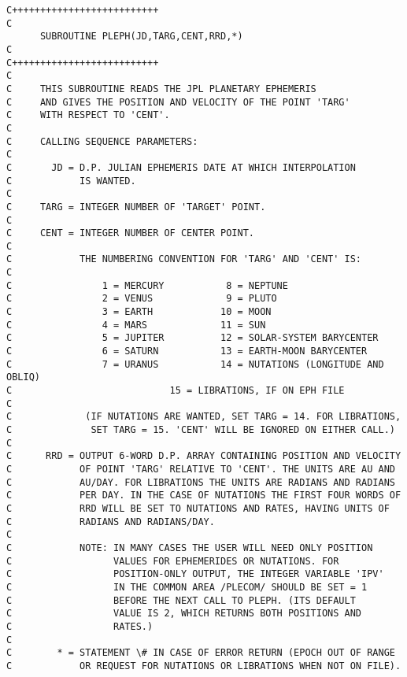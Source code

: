 \begin{verbatim}
C++++++++++++++++++++++++++
C
      SUBROUTINE PLEPH(JD,TARG,CENT,RRD,*)
C
C++++++++++++++++++++++++++
C
C     THIS SUBROUTINE READS THE JPL PLANETARY EPHEMERIS
C     AND GIVES THE POSITION AND VELOCITY OF THE POINT 'TARG'
C     WITH RESPECT TO 'CENT'.
C
C     CALLING SEQUENCE PARAMETERS:
C
C       JD = D.P. JULIAN EPHEMERIS DATE AT WHICH INTERPOLATION
C            IS WANTED.
C
C     TARG = INTEGER NUMBER OF 'TARGET' POINT.
C
C     CENT = INTEGER NUMBER OF CENTER POINT.
C
C            THE NUMBERING CONVENTION FOR 'TARG' AND 'CENT' IS:
C
C                1 = MERCURY           8 = NEPTUNE
C                2 = VENUS             9 = PLUTO
C                3 = EARTH            10 = MOON
C                4 = MARS             11 = SUN
C                5 = JUPITER          12 = SOLAR-SYSTEM BARYCENTER
C                6 = SATURN           13 = EARTH-MOON BARYCENTER
C                7 = URANUS           14 = NUTATIONS (LONGITUDE AND OBLIQ)
C                            15 = LIBRATIONS, IF ON EPH FILE
C
C             (IF NUTATIONS ARE WANTED, SET TARG = 14. FOR LIBRATIONS,
C              SET TARG = 15. 'CENT' WILL BE IGNORED ON EITHER CALL.)
C
C      RRD = OUTPUT 6-WORD D.P. ARRAY CONTAINING POSITION AND VELOCITY
C            OF POINT 'TARG' RELATIVE TO 'CENT'. THE UNITS ARE AU AND
C            AU/DAY. FOR LIBRATIONS THE UNITS ARE RADIANS AND RADIANS
C            PER DAY. IN THE CASE OF NUTATIONS THE FIRST FOUR WORDS OF
C            RRD WILL BE SET TO NUTATIONS AND RATES, HAVING UNITS OF
C            RADIANS AND RADIANS/DAY.
C
C            NOTE: IN MANY CASES THE USER WILL NEED ONLY POSITION
C                  VALUES FOR EPHEMERIDES OR NUTATIONS. FOR
C                  POSITION-ONLY OUTPUT, THE INTEGER VARIABLE 'IPV'
C                  IN THE COMMON AREA /PLECOM/ SHOULD BE SET = 1
C                  BEFORE THE NEXT CALL TO PLEPH. (ITS DEFAULT
C                  VALUE IS 2, WHICH RETURNS BOTH POSITIONS AND
C                  RATES.)
C
C        * = STATEMENT \# IN CASE OF ERROR RETURN (EPOCH OUT OF RANGE
C            OR REQUEST FOR NUTATIONS OR LIBRATIONS WHEN NOT ON FILE).
\end{verbatim}

